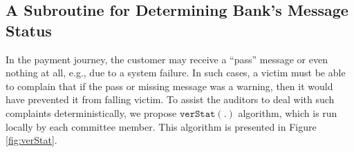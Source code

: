 

\subsection{A Subroutine for Determining Bank's Message Status}\label{Determining-Bank-Message-Status}

In the payment journey, the customer may receive a ``pass'' message or even nothing at all, e.g., due to a system failure. In such cases,  a victim must be able to complain that if the pass or missing message was a warning, then it would have prevented it from falling victim. To assist the auditors to deal with such complaints deterministically, we propose $\mathtt{verStat}(.)$ algorithm, which is run locally by each committee member. This algorithm is presented in Figure \ref{fig:verStat}. 


